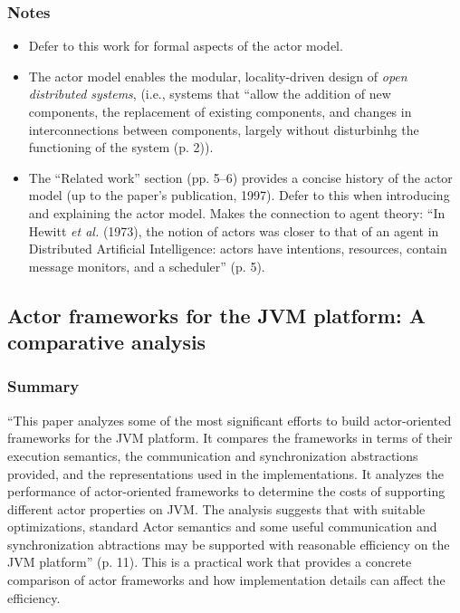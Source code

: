 \subsubsection*{Notes}
\begin{itemize}
\item Defer to this work for formal aspects of the actor model.
\item The actor model enables the modular, locality-driven design of \emph{open distributed systems}, (i.e., systems that ``allow the addition of new components, the replacement of existing components, and changes in  interconnections between components, largely without disturbinhg the functioning of the system (p. 2)).
\item The ``Related work'' section (pp. 5--6) provides a concise history of the actor model (up to the paper's publication, 1997). Defer to this when introducing and explaining the actor model. Makes the connection to agent theory: ``In Hewitt \emph{et al.} (1973), the notion of actors was closer to that of an agent in Distributed Artificial Intelligence: actors  have intentions, resources, contain message monitors, and a scheduler'' (p. 5).
\end{itemize}

\subsection{Actor frameworks for the JVM platform: A comparative analysis}
\subsubsection*{Summary}
``This paper analyzes some of the most significant efforts to build actor-oriented frameworks for the JVM platform. It compares the frameworks in terms of their execution semantics, the communication and synchronization abstractions provided, and the representations used in the implementations. It analyzes the performance of actor-oriented frameworks to determine the costs of supporting different actor properties on JVM. The analysis suggests that with suitable optimizations, standard Actor semantics and some useful communication and synchronization abtractions may be supported with reasonable efficiency on the JVM platform'' (p. 11). This is a practical work that provides a concrete comparison of actor frameworks and how implementation details can affect the efficiency.
